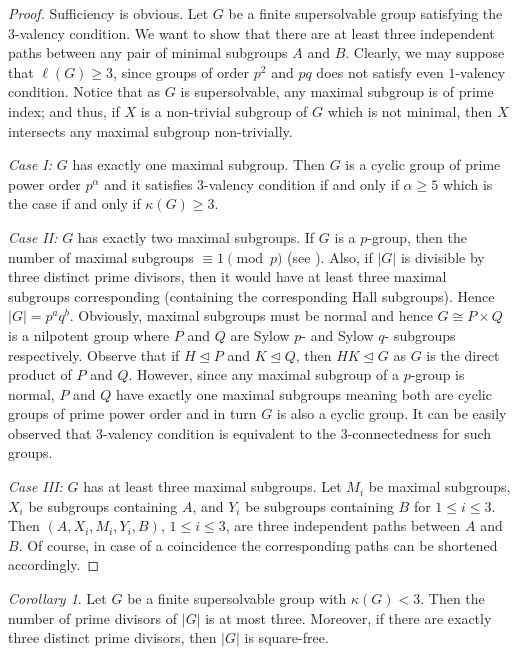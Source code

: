\documentclass[a4paper,12pt]{article}
\theoremstyle{definition}
\theoremstyle{remark}
\theoremstyle{theorem}
\newtheorem{cor}[theorem]{Corollary}
\begin{document}
\begin{proof}
  Sufficiency is obvious. Let $G$ be a finite supersolvable group
  satisfying the $3$-valency condition. We want to show that there are
  at least three independent paths between any pair of minimal
  subgroups $A$ and $B$. Clearly, we may suppose that $\ell(G)\geq 3$,
  since groups of order $p^2$ and $pq$ does not satisfy even
  $1$-valency condition. Notice that as $G$ is supersolvable, any
  maximal subgroup is of prime index; and thus, if $X$ is a
  non-trivial subgroup of $G$ which is not minimal, then $X$
  intersects any maximal subgroup non-trivially.

  \emph{Case I:} $G$ has exactly one maximal subgroup. Then $G$ is a
  cyclic group of prime power order $p^{\alpha}$ and it satisfies
  $3$-valency condition if and only if $\alpha\geq 5$ which is the
  case if and only if $\kappa(G)\geq 3$.

  \emph{Case II:} $G$ has exactly two maximal subgroups. If $G$ is a
  $p$-group, then the number of maximal subgroups $\equiv 1 \pmod{p}$
  (see \cite[p.~30]{Berkovich2008}). Also, if $|G|$ is divisible by
  three distinct prime divisors, then it would have at least three
  maximal subgroups corresponding (containing the corresponding Hall
  subgroups). Hence $|G|=p^aq^b$. Obviously, maximal subgroups must be
  normal and hence $G\cong P\times Q$ is a nilpotent group where $P$ and
  $Q$ are Sylow $p$- and Sylow $q$- subgroups respectively. Observe
  that if $H\trianglelefteq P$ and $K\trianglelefteq Q$, then
  $HK\trianglelefteq G$ as $G$ is the direct product of $P$ and
  $Q$. However, since any maximal subgroup of a $p$-group is normal,
  $P$ and $Q$ have exactly one maximal subgroups meaning both are
  cyclic groups of prime power order and in turn $G$ is also a cyclic
  group. It can be easily observed that $3$-valency condition is
  equivalent to the $3$-connectedness for such groups.

  \emph{Case III:} $G$ has at least three maximal subgroups. Let $M_i$
  be maximal subgroups, $X_i$ be subgroups containing $A$, and $Y_i$
  be subgroups containing $B$ for $1\leq i\leq 3$. Then
  $(A,X_i,M_i,Y_i,B)$, $1\leq i \leq 3$, are three independent paths
  between $A$ and $B$. Of course, in case of a coincidence the
  corresponding paths can be shortened accordingly.
\end{proof}

\begin{cor}\label{cor:divisors}
  Let $G$ be a finite supersolvable group with $\kappa(G)<3$. Then the
  number of prime divisors of $|G|$ is at most three. Moreover, if
  there are exactly three distinct prime divisors, then $|G|$ is
  square-free.
\end{cor}
\end{document}

